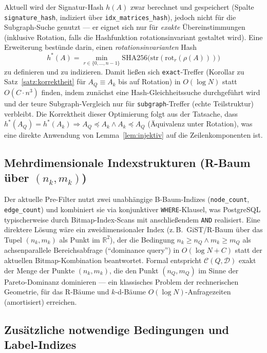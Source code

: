 \documentclass[a4paper,12pt, twoside]{report}
\theoremstyle{definition}
\begin{document}
Aktuell wird der Signatur-Hash $h(A)$ zwar berechnet und gespeichert (Spalte \texttt{signature\_hash}, indiziert über \texttt{idx\_matrices\_hash}), jedoch nicht für die Subgraph-Suche genutzt — er eignet sich nur für \emph{exakte} Übereinstimmungen (inklusive Rotation, falls die Hashfunktion rotationsinvariant gestaltet wird). Eine Erweiterung bestünde darin, einen \emph{rotationsinvarianten} Hash
\[
h^*(A) = \min_{r \in \{0,\ldots,n-1\}} \mathrm{SHA256}\bigl(\mathrm{str}(\mathrm{rot}_r(\rho(A)))\bigr)
\]
zu definieren und zu indizieren. Damit ließen sich \texttt{exact}-Treffer (Korollar zu Satz~\ref{satz:korrektheit} für $A_Q \equiv A_k$ bis auf Rotation) in $O(\log N)$ statt $O(C \cdot n^3)$ finden, indem zunächst eine Hash-Gleichheitssuche durchgeführt wird und der teure Subgraph-Vergleich nur für \texttt{subgraph}-Treffer (echte Teilstruktur) verbleibt. Die Korrektheit dieser Optimierung folgt aus der Tatsache, dass $h^*(A_Q) = h^*(A_k) \Rightarrow A_Q \preceq A_k \wedge A_k \preceq A_Q$ (Äquivalenz unter Rotation), was eine direkte Anwendung von Lemma~\ref{lem:injektiv} auf die Zeilenkomponenten ist.


\subsection{Mehrdimensionale Indexstrukturen (R-Baum über $(n_k,m_k)$)}

Der aktuelle Pre-Filter nutzt zwei unabhängige B-Baum-Indizes (\texttt{node\_count}, \texttt{edge\_count}) und kombiniert sie via konjunktiver \texttt{WHERE}-Klausel, was PostgreSQL typischerweise durch Bitmap-Index-Scans mit anschließendem \texttt{AND} realisiert. Eine direktere Lösung wäre ein zweidimensionaler Index (z.\,B.\ GiST/R-Baum über das Tupel $(n_k,m_k)$ als Punkt im $\mathbb{R}^2$), der die Bedingung $n_k \ge n_Q \wedge m_k \ge m_Q$ als achsenparallele Bereichsabfrage (``dominance query'') in $O(\log N + C)$ statt der aktuellen Bitmap-Kombination beantwortet. Formal entspricht $\mathcal{C}(Q,\mathcal{D})$ exakt der Menge der Punkte $(n_k,m_k)$, die den Punkt $(n_Q,m_Q)$ im Sinne der Pareto-Dominanz dominieren — ein klassisches Problem der rechnerischen Geometrie, für das R-Bäume und $k$-d-Bäume $O(\log N)$-Anfragezeiten (amortisiert) erreichen.


\subsection{Zusätzliche notwendige Bedingungen und Label-Indizes}
\end{document}
